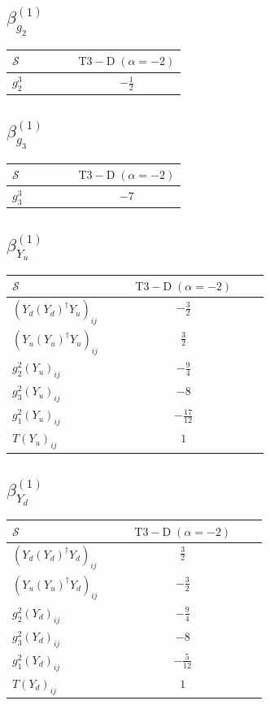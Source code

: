 \documentclass[9pt]{article}
\begin{document}
\subsection*{$ \beta_{g_2}^{(1)} $}
\begin{longtable}{@{}p{0.38\linewidth}c@{}}
\toprule
$\mathcal{S}$ & $ \mathrm{T3-D}\;(\alpha=-2) $ \\
\midrule
$ g_2^3 $ & $ - \frac{1}{2} $ \\
\bottomrule
\end{longtable}
\subsection*{$ \beta_{g_3}^{(1)} $}
\begin{longtable}{@{}p{0.38\linewidth}c@{}}
\toprule
$\mathcal{S}$ & $ \mathrm{T3-D}\;(\alpha=-2) $ \\
\midrule
$ g_3^3 $ & $ -7 $ \\
\bottomrule
\end{longtable}
\subsection*{$ \beta_{Y_u}^{(1)} $}
\begin{longtable}{@{}p{0.38\linewidth}c@{}}
\toprule
$\mathcal{S}$ & $ \mathrm{T3-D}\;(\alpha=-2) $ \\
\midrule
$ (Y_d (Y_d)^{\dagger} Y_u)_{ij} $ & $ - \frac{3}{2} $ \\
$ (Y_u (Y_u)^{\dagger} Y_u)_{ij} $ & $ \frac{3}{2} $ \\
$ g_2^2 (Y_u)_{ij} $ & $ - \frac{9}{4} $ \\
$ g_3^2 (Y_u)_{ij} $ & $ -8 $ \\
$ g_1^2 (Y_u)_{ij} $ & $ - \frac{17}{12} $ \\
$ T (Y_u)_{ij} $ & $ 1 $ \\
\bottomrule
\end{longtable}
\subsection*{$ \beta_{Y_d}^{(1)} $}
\begin{longtable}{@{}p{0.38\linewidth}c@{}}
\toprule
$\mathcal{S}$ & $ \mathrm{T3-D}\;(\alpha=-2) $ \\
\midrule
$ (Y_d (Y_d)^{\dagger} Y_d)_{ij} $ & $ \frac{3}{2} $ \\
$ (Y_u (Y_u)^{\dagger} Y_d)_{ij} $ & $ - \frac{3}{2} $ \\
$ g_2^2 (Y_d)_{ij} $ & $ - \frac{9}{4} $ \\
$ g_3^2 (Y_d)_{ij} $ & $ -8 $ \\
$ g_1^2 (Y_d)_{ij} $ & $ - \frac{5}{12} $ \\
$ T (Y_d)_{ij} $ & $ 1 $ \\
\bottomrule
\end{longtable}
\end{document}
